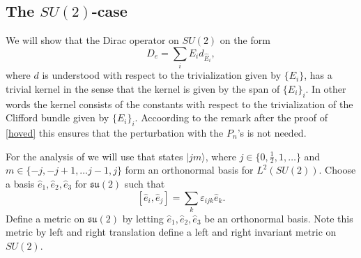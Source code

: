 \documentclass[12pt]{article}
\def\ca{{\cal A}}
\def\cb{{\cal B}}
\def\ce{{\cal E}}
\def\ch{{\cal H}}
\begin{document}
{\subsection{The $SU(2)$-case}
We will show that the  Dirac operator on $SU(2)$ on the form 
$$ D_e=\sum_i E_id_{\hat{E}_i},$$
where $d$ is understood with respect to the trivialization given by $\{E_i\}$, has a trivial kernel in the sense that the kernel is given by the span of $\{E_i \}_i$. In other words the kernel consists of the constants with respect to the trivialization of the Clifford bundle given by  $\{E_i \}_i$. Accoording to the remark after the proof of \ref{hoved} this ensures that the perturbation with the $P_n$'s is not needed.

For the analysis of we will use that states $|jm\rangle $, where $j\in \{0,\frac{1}{2},1,\ldots \}$ and $m\in \{-j,-j+1,\ldots j-1,j\}$ form an orthonormal basis for $L^2(SU(2))$. 
Choose a basis $\hat{e}_1,\hat{e}_2,\hat{e}_3$ for $\mathfrak{su}(2)$ such that
$$[\hat{e}_i, \hat{e}_j]=\sum_k\varepsilon_{ijk}\hat{e}_k.$$
Define a metric on $\mathfrak{su}(2)$ by letting $\hat{e}_1,\hat{e}_2,\hat{e}_3$ be an orthonormal basis. Note this metric by left and right translation define a left and right invariant metric on $SU(2)$.

}
\end{document}
